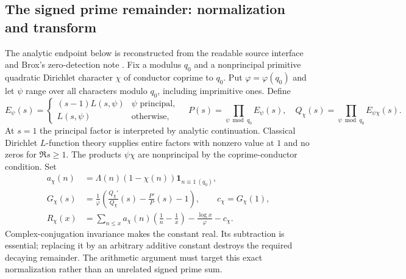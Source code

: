 \documentclass[11pt,a4paper]{article}
\begin{document}
\subsection{The signed prime remainder: normalization and transform}
The analytic endpoint below is reconstructed from the readable source interface and Brox's zero-detection note \cite{broxzero}. Fix a modulus $q_0$ and a nonprincipal primitive quadratic Dirichlet character $\chi$ of conductor coprime to $q_0$. Put $\varphi=\varphi(q_0)$ and let $\psi$ range over all characters modulo $q_0$, including imprimitive ones. Define
\[
E_\psi(s)=\begin{cases}(s-1)L(s,\psi)&\psi\text{ principal},\\L(s,\psi)&\text{otherwise},\end{cases}\quad
P(s)=\prod_{\psi\bmod q_0}E_\psi(s),\quad Q_\chi(s)=\prod_{\psi\bmod q_0}E_{\psi\chi}(s).
\]
At $s=1$ the principal factor is interpreted by analytic continuation. Classical Dirichlet $L$-function theory supplies entire factors with nonzero value at $1$ and no zeros for $\Re s\geq1$. The products $\psi\chi$ are nonprincipal by the coprime-conductor condition. Set
\begin{align}
a_\chi(n)&=\Lambda(n)(1-\chi(n))\mathbf1_{n\equiv1\ (q_0)},\\
G_\chi(s)&=\frac{1}{\varphi}\left(\frac{Q_\chi'}{Q_\chi}(s)-\frac{P'}P(s)-1\right),\qquad c_\chi=G_\chi(1),\\
R_\chi(x)&=\sum_{n\leq x}a_\chi(n)\left(\frac1n-\frac1x\right)-\frac{\log x}{\varphi}-c_\chi.\label{eq:prime}
\end{align}
Complex-conjugation invariance makes the constant real. Its subtraction is essential; replacing it by an arbitrary additive constant destroys the required decaying remainder. The arithmetic argument must target this exact normalization rather than an unrelated signed prime sum.
\end{document}
